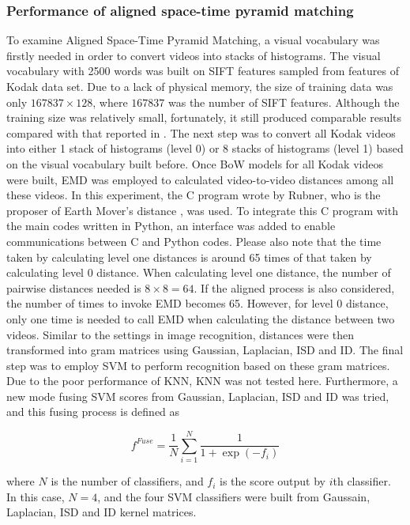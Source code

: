 \subsubsection{Performance of aligned space-time pyramid matching}
To examine Aligned Space-Time Pyramid Matching, a visual vocabulary was firstly needed in order to convert videos into stacks of histograms. The visual vocabulary with 2500 words was built on SIFT features sampled from features of Kodak data set. Due to a lack of physical memory, the size of training data was only $167837 \times 128$, where $167837$ was the number of SIFT features. Although the training size was relatively small, fortunately, it still produced comparable results compared with that reported in \cite{duan2012visual}. The next step was to convert all Kodak videos into either 1 stack of histograms (level 0) or 8 stacks of histograms (level 1) based on the visual vocabulary built before. Once BoW models for all Kodak videos were built, EMD was employed to calculated video-to-video distances among all these videos. In this experiment, the C program wrote by Rubner, who is the proposer of Earth Mover's distance \cite{rubner2000earth}, was used. To integrate this C program with the main codes written in Python, an interface was added to enable communications between C and Python codes. Please also note that the time taken by calculating level one distances is around 65 times of that taken by calculating level 0 distance. When calculating level one distance, the number of pairwise distances needed is $8 \times 8 = 64$. If the aligned process is also considered, the number of times to invoke EMD becomes 65. However, for level 0 distance, only one time is needed to call EMD when calculating the distance between two videos. Similar to the settings in image recognition, distances were then transformed into gram matrices using Gaussian, Laplacian, ISD and ID. The final step was to employ SVM to perform recognition based on these gram matrices. Due to the poor performance of KNN, KNN was not tested here. Furthermore, a new mode fusing SVM scores from Gaussian, Laplacian, ISD and ID was tried, and this fusing process is defined as

\begin{equation}
f^{Fuse} = \frac{1}{N} \sum_{i=1}^{N} \frac{1}{1 +\exp{(-f_i)}}
\end{equation}

\noindent where $N$ is the number of classifiers, and $f_i$ is the score output by $i$th classifier. In this case, $N = 4$, and the four SVM classifiers were built from Gaussain, Laplacian, ISD and ID kernel matrices. \\

